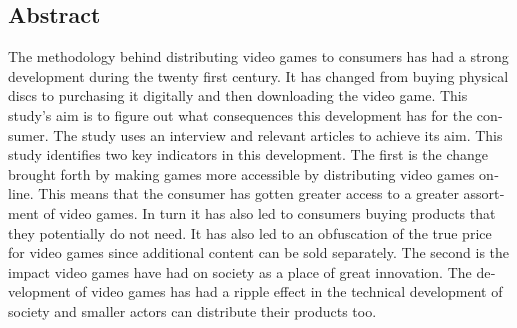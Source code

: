 \documentclass[11p]{article}
\begin{document}
    \begin{otherlanguage}{english}
        \newpage
\setlength{\parskip}{10pt}

    \section{Abstract}

    The methodology behind distributing video games to consumers has had a strong development during the twenty first century.
    It has changed from buying physical discs to purchasing it digitally and then downloading the video game.
    This study's aim is to figure out what consequences this development has for the consumer.
    The study uses an interview and relevant articles to achieve its aim.
    This study identifies two key indicators in this development.
    The first is the change brought forth by making games more accessible by distributing video games online.
    This means that the consumer has gotten greater access to a greater assortment of video games.
    In turn it has also led to consumers buying products that they potentially do not need.
    It has also led to an obfuscation of the true price for video games since additional content can be sold separately.
    The second is the impact video games have had on society as a place of great innovation.
    The development of video games has had a ripple effect in the technical development of society and smaller actors can distribute their products too.
    \newpage
    \end{otherlanguage}
\end{document}
